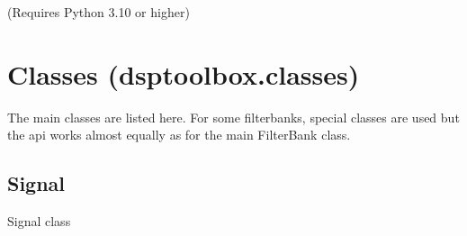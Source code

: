 \documentclass[letterpaper,10pt,english]{sphinxmanual}
\begin{document}
\sphinxAtStartPar
(Requires Python 3.10 or higher)

\sphinxstepscope


\chapter{Classes (dsptoolbox.classes)}
\label{\detokenize{classes:classes-dsptoolbox-classes}}\label{\detokenize{classes::doc}}
\sphinxAtStartPar
The main classes are listed here. For some filterbanks, special classes are used but the api works almost equally
as for the main FilterBank class.


\section{Signal}
\label{\detokenize{classes:module-dsptoolbox.classes.signal_class}}\label{\detokenize{classes:signal}}
\sphinxAtStartPar
Signal class
\end{document}

